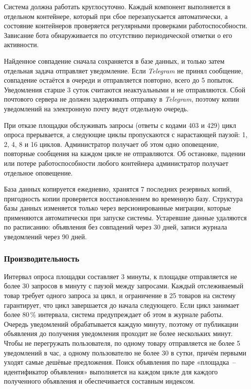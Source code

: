 Система должна работать круглосуточно. Каждый компонент выполняется в отдельном контейнере, который при сбое перезапускается автоматически, а состояние контейнеров проверяется регулярными проверками работоспособности. Зависание бота обнаруживается по отсутствию периодической отметки о его активности.

Найденное совпадение сначала сохраняется в базе данных, и только затем отдельная задача отправляет уведомление. Если \textit{Telegram} не принял сообщение, совпадение остаётся в очереди и отправляется повторно, всего до 5 попыток. Уведомления старше 3 суток считаются неактуальными и не отправляются. Сбой почтового сервера не должен задерживать отправку в \textit{Telegram}, поэтому копии уведомлений на электронную почту ведут отдельную очередь.

При отказе площадки обслуживать запросы (ответы с кодами 403 и 429) цикл опроса прерывается, а следующие циклы пропускаются с нарастающей паузой: 1, 2, 4, 8 и 16 циклов. Администратор получает об этом одно оповещение, повторные сообщения на каждом цикле не отправляются. Об остановке, падении или потере работоспособности любого контейнера администратор получает отдельное оповещение.

База данных копируется ежедневно, хранятся 7 последних резервных копий, пригодность копии проверяется восстановлением во временную базу. Структура базы данных изменяется только через версионированные миграции, которые применяются автоматически при запуске системы. Устаревшие данные удаляются по расписанию: объявления без совпадений через 30 дней, записи журнала уведомлений через 90 дней.

\subsubsection{Производительность}

Интервал опроса площадки составляет 3 минуты, к площадке отправляется не более 30 запросов в минуту с паузой между запросами. Каждый отслеживаемый товар требует одного запроса за цикл, и ограничение в 25 товаров на систему гарантирует, что цикл завершается до начала следующего. Если цикл занимает более 80\,\% интервала, система предупреждает об этом в журнале работы. Очередь уведомлений обрабатывается каждую минуту, поэтому от публикации объявления до получения уведомления проходит не более нескольких минут. Чтобы не перегружать пользователя, по одному товару отправляется не более 5 уведомлений в час, а одному пользователю не более 30 в сутки, причём первыми уходят самые дешёвые предложения. Поиск объявления по паре «площадка~-- идентификатор объявления» выполняется на каждом цикле для каждого полученного объявления и обеспечивается составным индексом.

